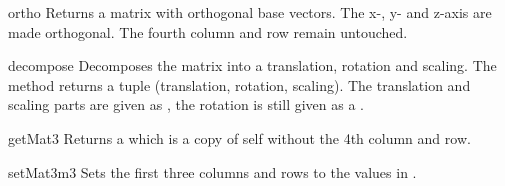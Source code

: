 \begin{methoddesc}{ortho}{}
Returns a matrix with orthogonal base vectors. The x-, y- and z-axis
are made orthogonal. The fourth column and row remain untouched.
\end{methoddesc}

\begin{methoddesc}{decompose}{}
Decomposes the matrix into a translation, rotation and scaling. The
method returns a tuple (translation, rotation, scaling). The
translation and scaling parts are given as , the rotation is
still given as a .
\end{methoddesc}

\begin{methoddesc}{getMat3}{}
Returns a  which is a copy of self without the 4th column and row.
\end{methoddesc}

\begin{methoddesc}{setMat3}{m3}
Sets the first three columns and rows to the values in .
\end{methoddesc}


